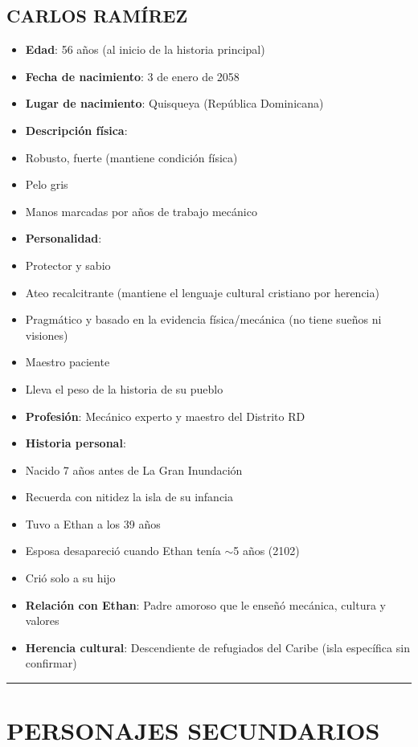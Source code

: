 \documentclass[11pt,a4paper]{report}
\begin{document}
\subsection{CARLOS RAMÍREZ}
\begin{itemize}
  \item \textbf{Edad}: 56 años (al inicio de la historia principal)
  \item \textbf{Fecha de nacimiento}: 3 de enero de 2058
  \item \textbf{Lugar de nacimiento}: Quisqueya (República Dominicana)
  \item \textbf{Descripción física}: 
  \item Robusto, fuerte (mantiene condición física)
  \item Pelo gris
  \item Manos marcadas por años de trabajo mecánico
  \item \textbf{Personalidad}:
  \item Protector y sabio
  \item Ateo recalcitrante (mantiene el lenguaje cultural cristiano por herencia)
  \item Pragmático y basado en la evidencia física/mecánica (no tiene sueños ni visiones)
  \item Maestro paciente
  \item Lleva el peso de la historia de su pueblo
  \item \textbf{Profesión}: Mecánico experto y maestro del Distrito RD
  \item \textbf{Historia personal}:
  \item Nacido 7 años antes de La Gran Inundación
  \item Recuerda con nitidez la isla de su infancia
  \item Tuvo a Ethan a los 39 años
  \item Esposa desapareció cuando Ethan tenía $\sim$5 años (2102)
  \item Crió solo a su hijo
  \item \textbf{Relación con Ethan}: Padre amoroso que le enseñó mecánica, cultura y valores
  \item \textbf{Herencia cultural}: Descendiente de refugiados del Caribe (isla específica sin confirmar)

\end{itemize}
\bigskip\hrule\bigskip

\section{PERSONAJES SECUNDARIOS}
\end{document}
